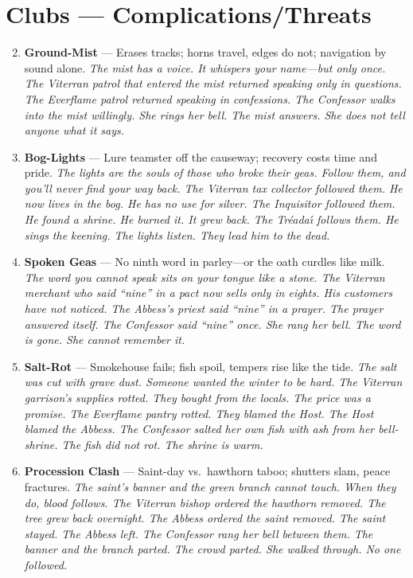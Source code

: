 \section*{Clubs --- Complications/Threats}
\label{sec:theona-complications}
\begin{enumerate}
\setcounter{enumi}{1}
\item \textbf{Ground-Mist} --- Erases tracks; horns travel, edges do not; navigation by sound alone.
  \hfill \textit{The mist has a voice. It whispers your name---but only once. The Viterran patrol that entered the mist returned speaking only in questions. The Everflame patrol returned speaking in confessions. The Confessor walks into the mist willingly. She rings her bell. The mist answers. She does not tell anyone what it says.}
\item \textbf{Bog-Lights} --- Lure teamster off the causeway; recovery costs time and pride.
  \hfill \textit{The lights are the souls of those who broke their geas. Follow them, and you'll never find your way back. The Viterran tax collector followed them. He now lives in the bog. He has no use for silver. The Inquisitor followed them. He found a shrine. He burned it. It grew back. The Tr\'eada\'{\i} follows them. He sings the keening. The lights listen. They lead him to the dead.}
\item \textbf{Spoken Geas} --- No ninth word in parley---or the oath curdles like milk.
  \hfill \textit{The word you cannot speak sits on your tongue like a stone. The Viterran merchant who said ``nine'' in a pact now sells only in eights. His customers have not noticed. The Abbess's priest said ``nine'' in a prayer. The prayer answered itself. The Confessor said ``nine'' once. She rang her bell. The word is gone. She cannot remember it.}
\item \textbf{Salt-Rot} --- Smokehouse fails; fish spoil, tempers rise like the tide.
  \hfill \textit{The salt was cut with grave dust. Someone wanted the winter to be hard. The Viterran garrison's supplies rotted. They bought from the locals. The price was a promise. The Everflame pantry rotted. They blamed the Host. The Host blamed the Abbess. The Confessor salted her own fish with ash from her bell-shrine. The fish did not rot. The shrine is warm.}
\item \textbf{Procession Clash} --- Saint-day vs.\ hawthorn taboo; shutters slam, peace fractures.
  \hfill \textit{The saint's banner and the green branch cannot touch. When they do, blood follows. The Viterran bishop ordered the hawthorn removed. The tree grew back overnight. The Abbess ordered the saint removed. The saint stayed. The Abbess left. The Confessor rang her bell between them. The banner and the branch parted. The crowd parted. She walked through. No one followed.}

\end{enumerate}
